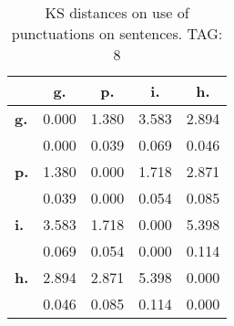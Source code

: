 \begin{table}[h!]
\begin{center}
\begin{tabular}{| l || c | c | c | c |}\hline
 & {\bf g.} & {\bf p.} & {\bf i.} & {\bf h.} \\\hline\hline
{\bf g.} & 0.000 & 1.380 & 3.583 & 2.894 \\
{\bf } & 0.000 & 0.039 & 0.069 & 0.046 \\\hline
{\bf p.} & 1.380 & 0.000 & 1.718 & 2.871 \\
{\bf } & 0.039 & 0.000 & 0.054 & 0.085 \\\hline
{\bf i.} & 3.583 & 1.718 & 0.000 & 5.398 \\
{\bf } & 0.069 & 0.054 & 0.000 & 0.114 \\\hline
{\bf h.} & 2.894 & 2.871 & 5.398 & 0.000 \\
{\bf } & 0.046 & 0.085 & 0.114 & 0.000 \\\hline
\end{tabular}
\caption{KS distances on use of punctuations on sentences. TAG: 8}
\end{center}
\end{table}